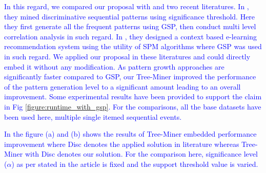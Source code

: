 \textcolor{blue}{In this regard, we compared our proposal with \cite{he2019significance} and \cite{tarus2018hybrid} two recent literatures. In \cite{he2019significance}, they mined discriminative sequential patterns using significance threshold. Here they first generate all the frequent patterns using GSP, then conduct multi level correlation analysis in such regard. In \cite{tarus2018hybrid}, they designed a context based e-learning recommendation system using the utility of SPM algorithms where GSP was used in such regard. We applied our proposal in these literatures and could directly embed it without any modification. As pattern growth approaches are significantly faster compared to GSP, our Tree-Miner improved the performance of the pattern generation level to a significant amount leading to an overall improvement. Some experimental results have been provided to support the claim in Fig \ref{figure:runtime_with_gsp}. For the comparisons, all the base datasets have been used here, multiple single itemed  sequential events.}

\textcolor{blue}{In the figure (a) and (b) shows the results of Tree-Miner embedded performance improvement where Disc denotes the applied solution in literature \cite{he2019significance} whereas Tree-Miner with Disc denotes our solution. For the comparison here, significance level ($\alpha$) as per stated in the article is fixed and the support threshold value is varied.}

